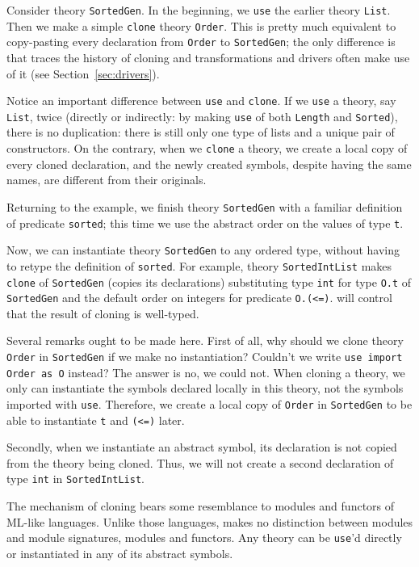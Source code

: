 Consider theory \texttt{SortedGen}. In the beginning, we
\texttt{use} the earlier theory \texttt{List}. Then we
make a simple \texttt{clone} theory \texttt{Order}.
This is pretty much equivalent to copy-pasting every
declaration from \texttt{Order} to \texttt{SortedGen};
the only difference is that \why traces the history
of cloning and transformations and drivers often make
use of it (see Section~\ref{sec:drivers}).

Notice an important difference between \texttt{use}
and \texttt{clone}. If we \texttt{use} a theory, say
\texttt{List}, twice (directly or indirectly: \eg by
making \texttt{use} of both \texttt{Length} and
\texttt{Sorted}), there is no duplication: there is
still only one type of lists and a unique pair
of constructors. On the contrary, when we \texttt{clone}
a theory, we create a local copy of every cloned
declaration, and the newly created symbols, despite
having the same names, are different from their originals.

Returning to the example, we finish theory \texttt{SortedGen}
with a familiar definition of predicate \texttt{sorted};
this time we use the abstract order on the values of type
\texttt{t}.

Now, we can instantiate theory \texttt{SortedGen} to any
ordered type, without having to retype the definition of
\texttt{sorted}. For example, theory \texttt{SortedIntList}
makes \texttt{clone} of \texttt{SortedGen} (\ie copies its
declarations) substituting type \texttt{int} for type
\texttt{O.t} of \texttt{SortedGen} and the default order
on integers for predicate \texttt{O.(<=)}. \why will
control that the result of cloning is well-typed.

Several remarks ought to be made here. First of all, why should
we clone theory \texttt{Order} in \texttt{SortedGen} if we make
no instantiation? Couldn't we write \texttt{use import Order as O}
instead? The answer is no, we could not. When cloning a theory,
we only can instantiate the symbols declared locally in this theory,
not the symbols imported with \texttt{use}. Therefore, we create
a local copy of \texttt{Order} in \texttt{SortedGen} to be able
to instantiate \texttt{t} and \texttt{(<=)} later.

Secondly, when we instantiate an abstract symbol, its declaration
is not copied from the theory being cloned. Thus, we will not create
a second declaration of type \texttt{int} in \texttt{SortedIntList}.

The mechanism of cloning bears some resemblance to modules and functors
of ML-like languages. Unlike those languages, \why makes no distinction
between modules and module signatures, modules and functors. Any \why
theory can be \texttt{use}'d directly or instantiated in any of its
abstract symbols.

